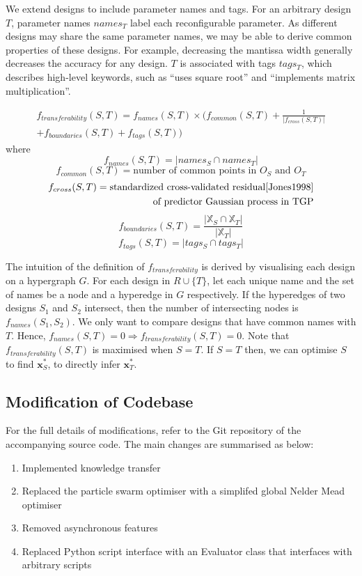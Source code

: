\documentclass[10pt,a4paper]{article}
\begin{document}
We extend designs to include parameter names and tags. For an arbitrary design $T$, parameter names $names_T$ label each reconfigurable parameter. As different designs may share the same parameter names, we may be able to derive common properties of these designs. For example, decreasing the mantissa width generally decreases the accuracy for any design. $T$ is associated with tags $tags_T$, which describes high-level keywords, such as ``uses square root'' and ``implements matrix multiplication''.

\[
	\begin{split}
		f_{transferability}(S,T)=f_{names}(S,T)\times(f_{common}(S,T)+\frac{1}{|f_{cross}(S,T)|}\\
			+f_{boundaries}(S,T)+f_{tags}(S,T))
	\end{split}
\] where
\[f_{names}(S,T)=|names_S\cap names_T|\]
\[f_{common}(S,T)=\text{number of common points in $O_S$ and $O_T$}\]
\[
	\begin{split}
		f_{cross}(S,T)=\text{standardized cross-validated residual\cite{Jones1998}}\\
			\text{of predictor Gaussian process in TGP}
	\end{split}
\]
\[f_{boundaries}(S,T)=\frac{|\mathbb{X}_S\cap\mathbb{X}_T|}{|\mathbb{X}_T|}\]
\[f_{tags}(S,T)=|tags_S\cap tags_T|\]

The intuition of the definition of $f_{transferability}$ is derived by visualising each design on a hypergraph $G$. For each design in $R\cup\{T\}$, let each unique name and the set of names be a node and a hyperedge in $G$ respectively. If the hyperedges of two designs $S_1$ and $S_2$ intersect, then the number of intersecting nodes is $f_{names}(S_1,S_2)$. We only want to compare designs that have common names with $T$. Hence, $f_{names}(S,T)=0\Rightarrow f_{transferability}(S,T)=0$. Note that $f_{transferability}(S,T)$ is maximised when $S=T$. If $S=T$ then, we can optimise $S$ to find $\mathbf{x}_S^*$, to directly infer $\mathbf{x}_T^*$.

\subsection{Modification of Codebase}

For the full details of modifications, refer to the Git repository of the accompanying source code. The main changes are summarised as below:
\begin{enumerate}
	\item Implemented knowledge transfer
	\item Replaced the particle swarm optimiser with a simplifed global Nelder Mead optimiser\cite{Luersen2004}
	\item Removed asynchronous features
	\item Replaced Python script interface with an Evaluator class that interfaces with arbitrary scripts 
\end{enumerate}
\end{document}
